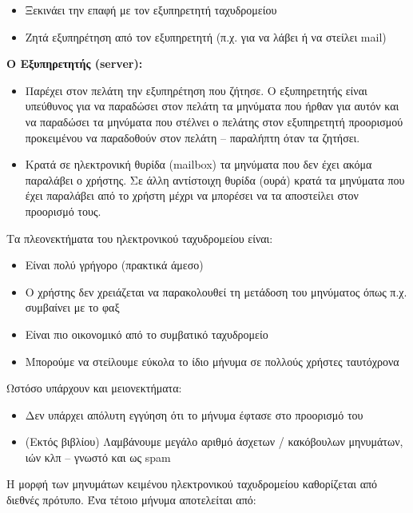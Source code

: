 \begin{itemize}
\item Ξεκινάει την επαφή με τον εξυπηρετητή ταχυδρομείου
\item Ζητά εξυπηρέτηση από τον εξυπηρετητή (π.χ. για να λάβει ή να στείλει mail)
\end{itemize}

\textbf{Ο Εξυπηρετητής (server):}

\begin{itemize}
\item Παρέχει στον πελάτη την εξυπηρέτηση που ζήτησε. Ο εξυπηρετητής είναι υπεύθυνος για να παραδώσει στον πελάτη τα μηνύματα που ήρθαν για αυτόν και να παραδώσει τα μηνύματα που στέλνει ο πελάτης στον εξυπηρετητή προορισμού προκειμένου να παραδοθούν στον πελάτη -- παραλήπτη όταν τα ζητήσει.
\item Κρατά σε ηλεκτρονική θυρίδα (mailbox) τα μηνύματα που δεν έχει ακόμα παραλάβει ο χρήστης. Σε άλλη αντίστοιχη θυρίδα (ουρά) κρατά τα μηνύματα που έχει παραλάβει από το χρήστη μέχρι να μπορέσει να τα αποστείλει στον προορισμό τους.
\end{itemize}

Τα πλεονεκτήματα του ηλεκτρονικού ταχυδρομείου είναι:

\begin{itemize}
\item Είναι πολύ γρήγορο (πρακτικά άμεσο)
\item Ο χρήστης δεν χρειάζεται να παρακολουθεί τη μετάδοση του μηνύματος όπως π.χ. συμβαίνει με το φαξ
\item Είναι πιο οικονομικό από το συμβατικό ταχυδρομείο
\item Μπορούμε να στείλουμε εύκολα το ίδιο μήνυμα σε πολλούς χρήστες ταυτόχρονα
\end{itemize}

Ωστόσο υπάρχουν και μειονεκτήματα:

\begin{itemize}
\item Δεν υπάρχει απόλυτη εγγύηση ότι το μήνυμα έφτασε στο προορισμό του
\item (Εκτός βιβλίου) Λαμβάνουμε μεγάλο αριθμό άσχετων / κακόβουλων μηνυμάτων, ιών κλπ -- γνωστό και ως spam
\end{itemize}

Η μορφή των μηνυμάτων κειμένου ηλεκτρονικού ταχυδρομείου καθορίζεται από διεθνές πρότυπο. Ένα τέτοιο μήνυμα αποτελείται από:


